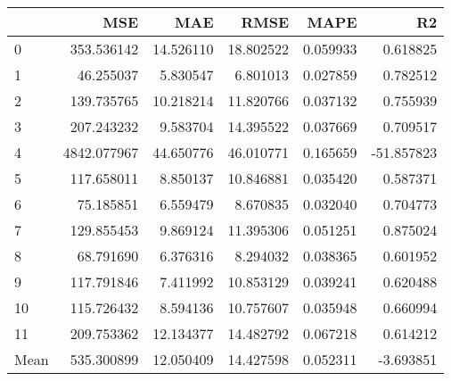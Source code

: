\begin{tabular}{lrrrrr}
\toprule
 & MSE & MAE & RMSE & MAPE & R2 \\
\midrule
0 & 353.536142 & 14.526110 & 18.802522 & 0.059933 & 0.618825 \\
1 & 46.255037 & 5.830547 & 6.801013 & 0.027859 & 0.782512 \\
2 & 139.735765 & 10.218214 & 11.820766 & 0.037132 & 0.755939 \\
3 & 207.243232 & 9.583704 & 14.395522 & 0.037669 & 0.709517 \\
4 & 4842.077967 & 44.650776 & 46.010771 & 0.165659 & -51.857823 \\
5 & 117.658011 & 8.850137 & 10.846881 & 0.035420 & 0.587371 \\
6 & 75.185851 & 6.559479 & 8.670835 & 0.032040 & 0.704773 \\
7 & 129.855453 & 9.869124 & 11.395306 & 0.051251 & 0.875024 \\
8 & 68.791690 & 6.376316 & 8.294032 & 0.038365 & 0.601952 \\
9 & 117.791846 & 7.411992 & 10.853129 & 0.039241 & 0.620488 \\
10 & 115.726432 & 8.594136 & 10.757607 & 0.035948 & 0.660994 \\
11 & 209.753362 & 12.134377 & 14.482792 & 0.067218 & 0.614212 \\
Mean & 535.300899 & 12.050409 & 14.427598 & 0.052311 & -3.693851 \\
\bottomrule
\end{tabular}
